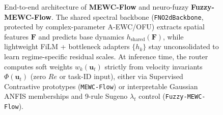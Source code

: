 \documentclass[11pt,a4paper]{article}
\begin{document}
\begin{figure}[!htbp]
{%
}
\caption{End-to-end architecture of \textbf{MEWC-Flow} and neuro-fuzzy \textbf{Fuzzy-MEWC-Flow}. The shared spectral backbone (\texttt{FNO2dBackbone}, protected by complex-parameter A-EWC/OFU) extracts spatial features $\mathbf{F}$ and predicts base dynamics $h_{\text{shared}}(\mathbf{F})$, while lightweight FiLM + bottleneck adapters $\{h_k\}$ stay unconsolidated to learn regime-specific residual scales. At inference time, the router computes soft weights $w_k(\mathbf{u}_t)$ strictly from velocity invariants $\Phi(\mathbf{u}_t)$ (zero $Re$ or task-ID input), either via Supervised Contrastive prototypes (\texttt{MEWC-Flow}) or interpretable Gaussian ANFIS memberships and 9-rule Sugeno $\lambda_t$ control (\texttt{Fuzzy-MEWC-Flow}).}
\label{fig:architecture}
\end{figure}
\end{document}
